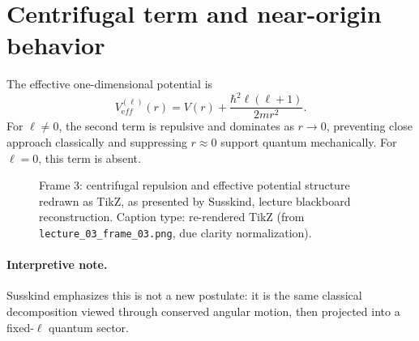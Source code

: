 \section{Centrifugal term and near-origin behavior}
The effective one-dimensional potential is
\[
V_{\mathrm eff}^{(\ell)}(r)=V(r)+\frac{\hbar^2\ell(\ell+1)}{2mr^2}.
\]
For \(\ell\neq0\), the second term is repulsive and dominates as \(r\to0\), preventing close approach classically and suppressing \(r\approx0\) support quantum mechanically. For \(\ell=0\), this term is absent.

\begin{figure}[h]
\centering
{}
\caption{Frame 3: centrifugal repulsion and effective potential structure redrawn as TikZ, as presented by Susskind, lecture blackboard reconstruction. Caption type: re-rendered TikZ (from \texttt{lecture_03_frame_03.png}, due clarity normalization).}
\end{figure}

\paragraph{Interpretive note.}
Susskind emphasizes this is not a new postulate: it is the same classical decomposition viewed through conserved angular motion, then projected into a fixed-\(\ell\) quantum sector.

